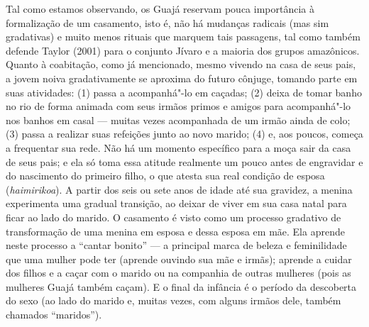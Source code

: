 Tal como estamos observando, os Guajá reservam pouca importância à
formalização de um casamento, isto é, não há mudanças radicais (mas sim
gradativas) e muito menos rituais que marquem tais passagens, tal como
também defende Taylor (2001) para o conjunto Jívaro e a maioria dos
grupos amazônicos. Quanto à coabitação, como já mencionado, mesmo
vivendo na casa de seus pais, a jovem noiva gradativamente se aproxima
do futuro cônjuge, tomando parte em suas atividades: (1) passa a
acompanhá"-lo em caçadas; (2) deixa de tomar banho no rio de forma
animada com seus irmãos primos e amigos para acompanhá"-lo nos banhos em
casal --- muitas vezes acompanhada de um irmão ainda de colo; (3) passa a
realizar suas refeições junto ao novo marido; (4) e, aos poucos, começa
a frequentar sua rede. Não há um momento específico para a moça sair da
casa de seus pais; e ela só toma essa atitude realmente um pouco antes
de engravidar e do nascimento do primeiro filho, o que atesta sua real
condição de esposa (\emph{haimirikoa}). A partir dos seis ou sete anos
de idade até sua gravidez, a menina experimenta uma gradual transição,
ao deixar de viver em sua casa natal para ficar ao lado do marido. O
casamento é visto como um processo gradativo de transformação de uma
menina em esposa e dessa esposa em mãe. Ela aprende neste processo a
``cantar bonito'' --- a principal marca de beleza e feminilidade que uma
mulher pode ter (aprende ouvindo sua mãe e irmãs); aprende a cuidar dos
filhos e a caçar com o marido ou na companhia de outras mulheres (pois
as mulheres Guajá também caçam). E o final da infância é o período da
descoberta do sexo (ao lado do marido e, muitas vezes, com alguns irmãos
dele, também chamados ``maridos'').

